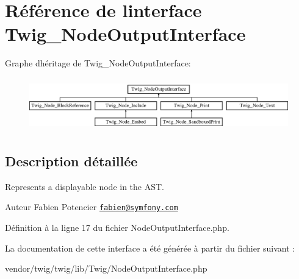 \hypertarget{interface_twig___node_output_interface}{}\section{Référence de l\textquotesingle{}interface Twig\+\_\+\+Node\+Output\+Interface}
\label{interface_twig___node_output_interface}
Graphe d\textquotesingle{}héritage de Twig\+\_\+\+Node\+Output\+Interface\+:\begin{figure}[H]
\begin{center}
\leavevmode
\includegraphics[height=2.333333cm]{interface_twig___node_output_interface}
\end{center}
\end{figure}


\subsection{Description détaillée}
Represents a displayable node in the A\+ST.

\begin{DoxyAuthor}{Auteur}
Fabien Potencier \href{mailto:fabien@symfony.com}{\tt fabien@symfony.\+com} 
\end{DoxyAuthor}


Définition à la ligne 17 du fichier Node\+Output\+Interface.\+php.



La documentation de cette interface a été générée à partir du fichier suivant \+:\begin{DoxyCompactItemize}
\item 
vendor/twig/twig/lib/\+Twig/Node\+Output\+Interface.\+php\end{DoxyCompactItemize}
